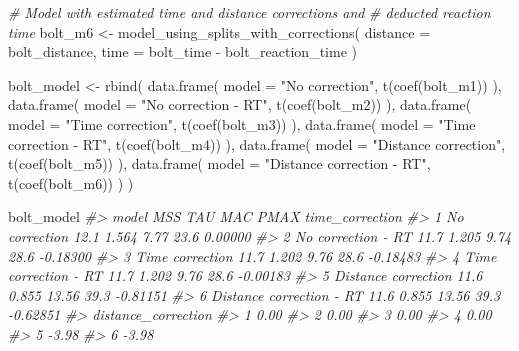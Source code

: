 \documentclass[fleqn,10pt,lineno]{wlpeerj} %
\newenvironment{Shaded}{\begin{snugshade}}{\end{snugshade}}
\newcommand{\AttributeTok}[1]{\textcolor[rgb]{0.77,0.63,0.00}{#1}}
\newcommand{\CommentTok}[1]{\textcolor[rgb]{0.56,0.35,0.01}{\textit{#1}}}
\newcommand{\FunctionTok}[1]{\textcolor[rgb]{0.00,0.00,0.00}{#1}}
\newcommand{\NormalTok}[1]{#1}
\newcommand{\OtherTok}[1]{\textcolor[rgb]{0.56,0.35,0.01}{#1}}
\newcommand{\SpecialCharTok}[1]{\textcolor[rgb]{0.00,0.00,0.00}{#1}}
\newcommand{\StringTok}[1]{\textcolor[rgb]{0.31,0.60,0.02}{#1}}
\begin{document}
\begin{Shaded}
\begin{Highlighting}[]
\CommentTok{\# Model with estimated time and distance corrections and}
\CommentTok{\#  deducted reaction time}
\NormalTok{bolt\_m6 }\OtherTok{\textless{}{-}} \FunctionTok{model\_using\_splits\_with\_corrections}\NormalTok{(}
  \AttributeTok{distance =}\NormalTok{ bolt\_distance,}
  \AttributeTok{time =}\NormalTok{ bolt\_time }\SpecialCharTok{{-}}\NormalTok{ bolt\_reaction\_time}
\NormalTok{)}

\NormalTok{bolt\_model }\OtherTok{\textless{}{-}} \FunctionTok{rbind}\NormalTok{(}
  \FunctionTok{data.frame}\NormalTok{(}
    \AttributeTok{model =} \StringTok{"No correction"}\NormalTok{,}
    \FunctionTok{t}\NormalTok{(}\FunctionTok{coef}\NormalTok{(bolt\_m1))}
\NormalTok{  ),}
  \FunctionTok{data.frame}\NormalTok{(}
    \AttributeTok{model =} \StringTok{"No correction {-} RT"}\NormalTok{,}
    \FunctionTok{t}\NormalTok{(}\FunctionTok{coef}\NormalTok{(bolt\_m2))}
\NormalTok{  ),}
  \FunctionTok{data.frame}\NormalTok{(}
    \AttributeTok{model =} \StringTok{"Time correction"}\NormalTok{,}
    \FunctionTok{t}\NormalTok{(}\FunctionTok{coef}\NormalTok{(bolt\_m3))}
\NormalTok{  ),}
  \FunctionTok{data.frame}\NormalTok{(}
    \AttributeTok{model =} \StringTok{"Time correction {-} RT"}\NormalTok{,}
    \FunctionTok{t}\NormalTok{(}\FunctionTok{coef}\NormalTok{(bolt\_m4))}
\NormalTok{  ),}
  \FunctionTok{data.frame}\NormalTok{(}
    \AttributeTok{model =} \StringTok{"Distance correction"}\NormalTok{,}
    \FunctionTok{t}\NormalTok{(}\FunctionTok{coef}\NormalTok{(bolt\_m5))}
\NormalTok{  ),}
  \FunctionTok{data.frame}\NormalTok{(}
    \AttributeTok{model =} \StringTok{"Distance correction {-} RT"}\NormalTok{,}
    \FunctionTok{t}\NormalTok{(}\FunctionTok{coef}\NormalTok{(bolt\_m6))}
\NormalTok{  )}
\NormalTok{)}

\NormalTok{bolt\_model}
\CommentTok{\#\textgreater{}                      model  MSS   TAU   MAC PMAX time\_correction}
\CommentTok{\#\textgreater{} 1            No correction 12.1 1.564  7.77 23.6         0.00000}
\CommentTok{\#\textgreater{} 2       No correction {-} RT 11.7 1.205  9.74 28.6        {-}0.18300}
\CommentTok{\#\textgreater{} 3          Time correction 11.7 1.202  9.76 28.6        {-}0.18483}
\CommentTok{\#\textgreater{} 4     Time correction {-} RT 11.7 1.202  9.76 28.6        {-}0.00183}
\CommentTok{\#\textgreater{} 5      Distance correction 11.6 0.855 13.56 39.3        {-}0.81151}
\CommentTok{\#\textgreater{} 6 Distance correction {-} RT 11.6 0.855 13.56 39.3        {-}0.62851}
\CommentTok{\#\textgreater{}   distance\_correction}
\CommentTok{\#\textgreater{} 1                0.00}
\CommentTok{\#\textgreater{} 2                0.00}
\CommentTok{\#\textgreater{} 3                0.00}
\CommentTok{\#\textgreater{} 4                0.00}
\CommentTok{\#\textgreater{} 5               {-}3.98}
\CommentTok{\#\textgreater{} 6               {-}3.98}
\end{Highlighting}
\end{Shaded}
\end{document}
